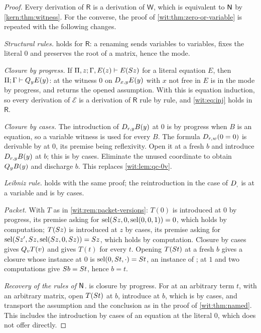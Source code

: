 \begin{proof}
Every derivation of $\mathsf{R}$ is a derivation of $\mathsf{W}$, which is
equivalent to $\mathsf{N}$ by \cref{kern:thm:witness}.  For the converse, the
proof of \cref{wit:thm:zero-or-variable} is repeated with the following
changes.

\emph{Structural rules.}   holds for
$\mathsf{R}$: a renaming sends variables to variables, fixes the literal $0$
and preserves the root of a matrix, hence the mode.

\emph{Closure by progress.}  If $\Pi,z;\Gamma,E(z)\vdash E(S z)$ for a
literal equation $E$, then $\Pi;\Gamma\vdash Q_{y}E(y)$:  at
the witness $0$ on $D_{x,y}E(y)$ with $x$ not free in $E$ is in the mode by
progress, and  returns the opened assumption.  With
 this is equation induction, so every derivation of
$\mathcal E$ is a derivation of $\mathsf{R}$ rule by rule, and
\eqref{wit:eq:inj} holds in $\mathsf{R}$.

\emph{Closure by cases.}  The introduction of $D_{r,y}B(y)$ at $0$ is by
progress when $B$ is an equation, so a variable witness is used for every
$B$.  The formula $D_{r,w}(0=0)$ is derivable by  at $0$, its
premise being reflexivity.  Open it at a fresh $b$ and introduce
$D_{r,y}B(y)$ at $b$; this is by cases.  Eliminate the unused coordinate to
obtain $Q_{y}B(y)$ and discharge $b$.  This replaces
\cref{wit:lem:qc-0v}.

\emph{Leibniz rule.}   holds with the same proof;
the reintroduction in the case of $D_{,}$ is at a variable and is by cases.

\emph{Packet.}  With $T$ as in \cref{wit:rem:packet-versions}: $T(0)$ is
introduced at $0$ by progress, its premise asking for
$\operatorname{sel}(S z,0,\operatorname{sel}(0,0,1))=0$, which holds by computation; $T(S z)$ is
introduced at $z$ by cases, its premise asking for
$\operatorname{sel}(S z',S z,\operatorname{sel}(S z,0,S z))=S z$, which holds by
computation.  Closure by cases gives $Q_{v}T(v)$ and  gives
$T(t)$ for every $t$.  Opening $T(S t)$ at a fresh $b$ gives a closure
whose instance at $0$ is $\operatorname{sel}(0,S t,\cdot)=S t$, an instance of
;  at $1$ and two computations give
$S b=S t$, hence $b=t$.

\emph{Recovery of the rules of $\mathsf{N}$.}   is closure by
progress.  For  at an arbitrary term $t$, with an arbitrary
matrix, open $T(S t)$ at $b$, introduce at $b$, which is by cases, and
transport the assumption and the conclusion as in the proof of
\cref{wit:thm:named}.  This includes the introduction by cases of an
equation at the literal $0$, which  does not offer directly.
\end{proof}

